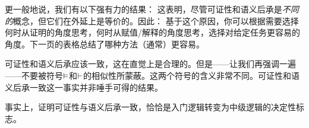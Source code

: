 更一般地说，我们有以下强有力的结果：
这表明，尽管可证性和语义后承是\emph{不同的}概念，但它们在外延上是等价的。因此：
基于这个原因，你可以根据需要选择何时从证明的角度思考，何时从赋值/解释的角度思考，选择对给定任务更容易的角度。下一页的表格总结了哪种方法（通常）更容易。

可证性和语义后承应该一致，这在直觉上是合理的。但是——让我们再强调一遍——不要被符号$\vDash$和$\vdash$的相似性所蒙蔽。这两个符号的含义非常不同。可证性和语义后承一致这一事实并非唾手可得的结果。

事实上，证明可证性与语义后承一致，恰恰是入门逻辑转变为中级逻辑的决定性标志。

\ifHTMLtarget


